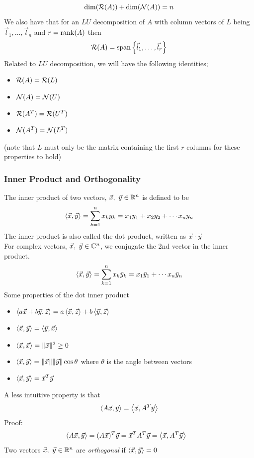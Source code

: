\documentclass[11pt, fleqn]{article}
\begin{document}
$$\dim(\mathcal{R}(A))+\dim(\mathcal{N}(A))=n$$
We also have that for an $LU$ decomposition of $A$ with column vectors of $L$ being $\vec{l}_1,\ldots,\vec{l}_n$ and $r=\operatorname{rank}(A)$ then
$$\mathcal{R}(A)=\operatorname{span}\left\{ \vec{l}_1,\ldots,\vec{l}_r \right\}$$
Related to $LU$ decomposition, we will have the following identities;
\begin{itemize}
    \item $\mathcal{R}(A)=\mathcal{R}(L)$
    \item $\mathcal{N}(A)=\mathcal{N}(U)$
    \item $\mathcal{R}(A^T)=\mathcal{R}(U^T)$
    \item $\mathcal{N}(A^T)=\mathcal{N}(L^T)$
\end{itemize}
(note that $L$ must only be the matrix containing the first $r$ columns for these properties to hold)

\subsubsection{Inner Product and Orthogonality}
The inner product of two vectors, $\vec{x},\ \vec{y}\in\R^n$ is defined to be
$$\left\langle \vec{x},\vec{y} \right\rangle=\sum_{k=1}^nx_ky_k=x_1y_1+x_2y_2+\cdots x_ny_n$$
The inner product is also called the dot product, written as $\vec{x}\cdot\vec{y}$\\
For complex vectors, $\vec{x},\ \vec{y}\in \mathbb{C}^n$, we conjugate the 2nd vector in the inner product.
$$\left\langle \vec{x},\vec{y} \right\rangle=\sum_{k=1}^nx_k\bar{y}_k=x_1\bar{y}_1+\cdots x_n\bar{y}_n$$
Some properties of the dot inner product
\begin{itemize}
    \item $\left\langle a\vec{x}+b\vec{y},\vec{z} \right\rangle=a\left\langle \vec{x},\vec{z} \right\rangle+b\left\langle \vec{y},\vec{z} \right\rangle$
    \item $\left\langle \vec{x},\vec{y} \right\rangle=\left\langle \vec{y},\vec{x} \right\rangle$
    \item $\left\langle \vec{x},\vec{x} \right\rangle=\|\vec{x}\|^2\geq0$
    \item $\left\langle \vec{x},\vec{y} \right\rangle=\|\vec{x}\|\|\vec{y}\|\cos\theta$ where $\theta$ is the angle between vectors
    \item $\left\langle \vec{x},\vec{y} \right\rangle=\vec{x}^T\vec{y}$
\end{itemize}
A less intuitive property is that
$$\left\langle A\vec{x},\vec{y} \right\rangle=\left\langle \vec{x},A^T\vec{y} \right\rangle$$
Proof:
\begin{align*}
    &\left\langle A\vec{x},\vec{y} \right\rangle=(A\vec{x})^T\vec{y}=\vec{x}^TA^T\vec{y}=\left\langle \vec{x},A^T\vec{y} \right\rangle
\end{align*}
Two vectors $\vec{x},\ \vec{y}\in\R^n$ are \textit{orthogonal} if $\left\langle \vec{x},\vec{y} \right\rangle=0$\\
\end{document}
